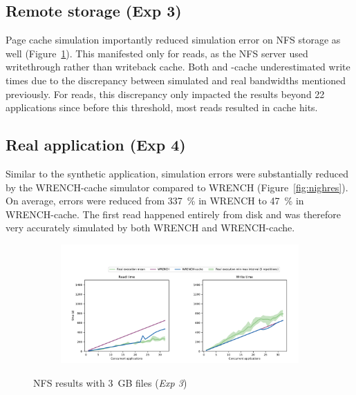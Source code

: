 \subsection{Remote storage (Exp 3)}

Page cache simulation importantly reduced simulation error
on NFS storage as well (Figure~\ref{fig:multi_nfs}). This
manifested only for reads, as the NFS server used writethrough rather than writeback cache.
Both \wrench and \wrench-cache
underestimated write times due to the discrepancy between
simulated and real bandwidths mentioned previously. For reads,
this discrepancy only impacted the results beyond 22
applications since before this threshold, most reads resulted in cache
hits.


\subsection{Real application (Exp 4)}
Similar to the synthetic application, simulation errors were
substantially reduced by the WRENCH-cache simulator compared to
WRENCH (Figure~\ref{fig:nighres}). On average, errors were reduced
from 337~\% in WRENCH to 47~\% in WRENCH-cache. 
The first read happened entirely from disk and was therefore 
very accurately simulated by both WRENCH and WRENCH-cache.

\begin{figure}
    \begin{subfigure}{\linewidth}
        \centering
        \includegraphics[width=\linewidth]{result/multi/figures/multi_nfs.pdf}
    \end{subfigure}
    \caption{NFS results with 3~GB files (\textit{Exp 3})}
    \label{fig:multi_nfs}
\end{figure}

